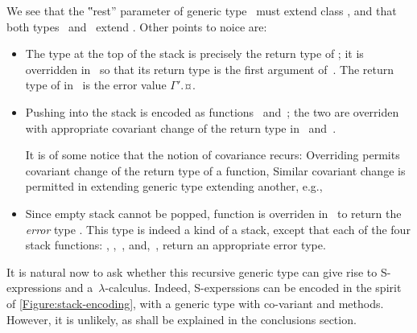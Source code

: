 We see that the ‟rest” parameter of generic type~ must extend class ,
  and that both types~ and~ extend .
Other points to noice are:
\begin{itemize}
  \item The type at the top of the stack is precisely the return type of ;
        it is overridden in~ so that its return type is the first argument of~.
        The return type of  in~ is the error value {$Γ'$.¤}.
  \item Pushing into the stack is encoded as functions~ and~;
        the two are overriden with appropriate covariant change of the return type in~ and~.
        \par
        It is of some notice that the notion of covariance recurs:
          Overriding permits covariant change of the return type of a function,
          Similar covariant change is permitted in extending generic type extending another, e.g.,
          \begin{center}
        \end{center}
  \item Since empty stack cannot be popped, function  is overriden in~ to return
    the \emph{error} type . This type is indeed a kind of a stack, except that each of the four stack
        functions: , ,~, and,~, return an appropriate error type.
\end{itemize}

It is natural now to ask whether this recursive generic type can give rise to S-expressions and a~$λ$-calculus.
Indeed, S-experssions can be encoded in the spirit of \cref{Figure:stack-encoding}, with a  generic type 
with co-variant  and  methods. However, it is unlikely, 
  as shall be explained in the conclusions section. 
